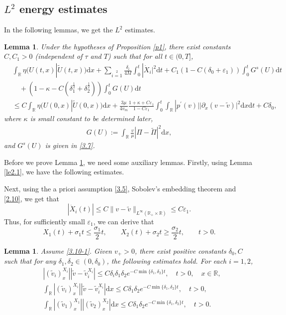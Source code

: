 \documentclass[10pt,reqno]{amsart}
\numberwithin{equation}{section}
\newtheorem{lemma}[theorem]{Lemma}
\newcommand{\dif}{\mathrm{d}}
\begin{document}
\subsection{$L^2$ energy estimates}
In the following lemmas, we get the $L^2$ estimates.
\begin{lemma}\label{le4.2}
Under the hypotheses of Proposition \ref{p1}, there exist constants $C, C_1>0$ (independent of $\tau$ and $T$) such that for all $t\in(0,T]$,
\begin{equation}\label{26.1}
\begin{aligned}
&\int_\mathbb{R}\eta(U(t,x)|\widetilde{U}(t,x))\dif x+\sum\limits_{i=1}\limits^2\frac{\delta_i}{4M}\int_0^t|\dot{X}_i|^2\dif t+C_1(1-C(\delta_0+\varepsilon_1))\int_0^tG^s(U)\dif t\\
&\quad+(1-\kappa-C(\delta^{\frac{1}{2}}_1+\delta^{\frac{1}{2}}_2))\int_0^tG(U)\dif t\\
 &\leq  C\int_\mathbb{R}\eta(U(0,x)|\widetilde{U}(0,x))\dif x
+\frac{3\mu}{4v_m}\frac{1+\kappa+C\varepsilon_1}{1-C\varepsilon_1}\int_0^t\int_\mathbb{R}|p^\prime(v)||\partial_x(v-\widetilde{v})|^2\dif x\dif t+C\delta_0,
\end{aligned}
\end{equation}
where $\kappa$ is small constant to be determined later,
\begin{align}\label{26.1b}
 G(U):=\int_\mathbb{R}\frac{v}{\mu}|\Pi-\widetilde{\Pi}|^2\dif x,
\end{align}
and $G^{s}(U)$ is given in \eqref{3.7}.
\end{lemma}
Before we prove Lemma \ref{le4.2}, we need some auxiliary lemmas. Firstly, using Lemma \ref{le2.1}, we have the following estimates.

Next, using the a priori assumption \eqref{3.5}, Sobolev's embedding theorem and  \eqref{2.10}, we get  that
\[
|\dot X_i(t)|\le C\|v-\widetilde v\|_{L^{\infty}(\mathbb{R}_+\times \mathbb{R})}\le C \varepsilon_1.
\]
Thus,  for sufficiently small $\varepsilon_1$, we can derive that
\begin{equation}\label{3.10-1}
X_1(t)+\sigma_1t\le \frac{\sigma_1}{2}t,\qquad X_2(t)+\sigma_2t\ge \frac{\sigma_2}{2}t, \qquad t >0.
\end{equation}
\begin{lemma}\label{le4.3}
Assume \eqref{3.10-1}. Given $v_+>0$, there exist positive constants $\delta_0,C$ such that for any $\delta_1,\delta_2\in(0,\delta_0)$, the following estimates hold. For each $i=1,2$,
\begin{align*}
&|(\widetilde{v}_i)_x^{X_i}||\widetilde{v}-\widetilde{v}_i^{X_i}|\le C\delta_i\delta_1\delta_2e^{-C\min\{\delta_1,\delta_2\}t},\quad t>0, \quad x\in \mathbb{R},\\
&\int_\mathbb{R}|(\widetilde{v}_i)_x^{X_i}||\widetilde{v}-\widetilde{v}_i^{X_i}|\dif x\le C\delta_1\delta_2e^{-C\min\{\delta_1,\delta_2\}t},\quad t>0,\\
&\int_\mathbb{R}|(\widetilde{v}_1)_x^{X_1}||(\widetilde{v}_2)_x^{X_2}|\dif x\le
C\delta_1\delta_2e^{-C\min\{\delta_1,\delta_2\}t},\quad t>0.
\end{align*}
\end{lemma}
\end{document}
